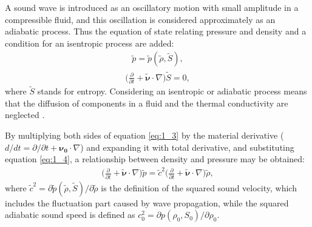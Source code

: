         A sound wave is introduced as an oscillatory motion with small amplitude in a compressible fluid, and this oscillation is considered approximately as an
adiabatic process. Thus the equation of state relating pressure and density and a condition for an isentropic process are added:
        \begin{align} \label{eq:1_3}
            \tilde{p}=\tilde{p}(\tilde{\rho},\tilde{S}),
        \end{align}
\vspace*{-7mm}
        \begin{align} \label{eq:1_4}
            \biggl( \frac{\partial}{\partial t} + \bm{\tilde{\nu}}\cdot\nabla \biggr)\tilde{S}=0,
        \end{align}
        where $\tilde{S}$ stands for entropy.
        Considering an isentropic or adiabatic process means that the diffusion of components in a fluid and the thermal conductivity are neglected
\parencite{Brekhovskikh1998AcousticsofLayered}.

        By multiplying both sides of equation \ref{eq:1_3} by the material derivative ($d/dt=\partial/\partial t + \bm{\nu_0} \cdot\nabla$) and expanding it with
total derivative, and substituting equation \ref{eq:1_4}, a relationship between density and pressure may be obtained:
        \begin{align} \label{eq:1_5}
            \biggl( \frac{\partial}{\partial t} + \bm{\tilde{\nu}}\cdot\nabla \biggr)\tilde{p}=\tilde{c}^2\biggl( \frac{\partial}{\partial t} +
\bm{\tilde{\nu}}\cdot\nabla \biggr)\tilde{\rho},
        \end{align}
        where $\tilde{c}^2 = \partial \tilde{p}(\tilde{\rho},\tilde{S}) / \partial \tilde{\rho}$ is the definition of the squared sound velocity, which includes the
fluctuation part caused by wave propagation, while the squared adiabatic sound speed is defined as $c^2_0 = \partial p(\rho_0,S_0) / \partial \rho_0$.

